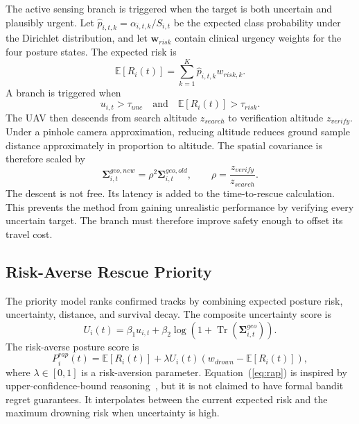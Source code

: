 \documentclass[runningheads]{llncs}
\newcommand{\operatorname}[1]{\mathop{\mathrm{#1}}}
\begin{document}
The active sensing branch is triggered when the target is both uncertain and plausibly urgent. Let $\hat{p}_{i,t,k}=\alpha_{i,t,k}/S_{i,t}$ be the expected class probability under the Dirichlet distribution, and let $\mathbf{w}_{risk}$ contain clinical urgency weights for the four posture states. The expected risk is
\begin{equation}
  \mathbb{E}[R_i(t)] = \sum_{k=1}^{K}\hat{p}_{i,t,k}w_{risk,k}.
\end{equation}
A branch is triggered when
\begin{equation}
  u_{i,t}>\tau_{unc} \quad \mathrm{and} \quad \mathbb{E}[R_i(t)]>\tau_{risk}.
  \label{eq:branch_condition}
\end{equation}
The UAV then descends from search altitude $z_{search}$ to verification altitude $z_{verify}$. Under a pinhole camera approximation, reducing altitude reduces ground sample distance approximately in proportion to altitude. The spatial covariance is therefore scaled by
\begin{equation}
  \boldsymbol{\Sigma}^{geo,new}_{i,t}=\rho^2\boldsymbol{\Sigma}^{geo,old}_{i,t}, \qquad
  \rho=\frac{z_{verify}}{z_{search}}.
\end{equation}
The descent is not free. Its latency is added to the time-to-rescue calculation. This prevents the method from gaining unrealistic performance by verifying every uncertain target. The branch must therefore improve safety enough to offset its travel cost.

\subsection{Risk-Averse Rescue Priority}

The priority model ranks confirmed tracks by combining expected posture risk, uncertainty, distance, and survival decay. The composite uncertainty score is
\begin{equation}
  U_i(t)=\beta_1u_{i,t}+\beta_2\log\!\left(1+\operatorname{Tr}(\boldsymbol{\Sigma}^{geo}_{i,t})\right).
\end{equation}
The risk-averse posture score is
\begin{equation}
  P^{rap}_i(t)=\mathbb{E}[R_i(t)]
  +\lambda U_i(t)\left(w_{drown}-\mathbb{E}[R_i(t)]\right),
  \label{eq:rap}
\end{equation}
where $\lambda \in [0,1]$ is a risk-aversion parameter. Equation~(\ref{eq:rap}) is inspired by upper-confidence-bound reasoning~\cite{auer2002ucb}, but it is not claimed to have formal bandit regret guarantees. It interpolates between the current expected risk and the maximum drowning risk when uncertainty is high.
\end{document}
